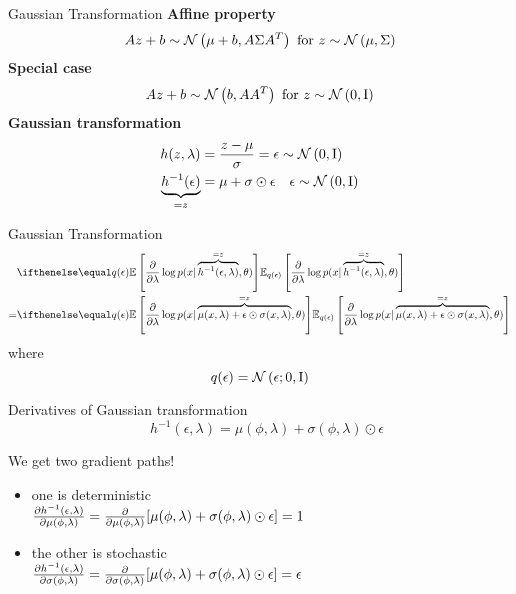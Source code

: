 \documentclass[14pt, aspectratio=169]{beamer}
\begin{document}
\begin{frame}{Gaussian Transformation}
\pause
\textbf{Affine property}
\begin{equation*}
Az + b \sim \mathcal{N}\left(\mu + b,A\Sigma A^{T}\right) \text{ for } z \sim \mathcal{N}\left(\mu,\Sigma\right)
\end{equation*}
\pause
\textbf{Special case}
\begin{equation*}
Az + b \sim \mathcal{N}\left(b,A A^{T}\right) \text{ for } z \sim \mathcal{N}\left(0,\operatorname{I}\right)
\end{equation*}
\pause
\textbf{Gaussian transformation}
\begin{align*}
h(z, \lambda) &= \frac{z - \mu}{ \sigma } = \epsilon \sim \mathcal{N}\left(0,\operatorname{I}\right) \\
\underbrace{h^{-1}(\epsilon)}_{=z} &= \mu + \sigma \odot \epsilon~~~\epsilon \sim \mathcal{N}\left(0,\operatorname{I}\right)
\end{align*}
\end{frame}

\begin{frame}{Gaussian Transformation}
\begin{equation*}
\begin{aligned}
&\E[q(\epsilon)]{\pdv{\lambda} \log p(x| \overbrace{h^{-1}(\epsilon, \lambda)}^{=z}, \theta)}  \\
= &\E[q(\epsilon)]{\pdv{\lambda} \log p(x| \overbrace{\mu(x, \lambda) + \epsilon \odot \sigma(x, \lambda)}^{=z}, \theta)}
\end{aligned}
\end{equation*}
\pause
where
\begin{equation*}
q(\epsilon) = \mathcal{N}\left(\epsilon; 0, \operatorname{I}\right)
\end{equation*}
\end{frame}

\begin{frame}{Derivatives of Gaussian transformation}
$$\quad h^{-1}(\epsilon, \lambda) = \mu(\phi,\lambda) + \sigma(\phi,\lambda) \odot \epsilon $$

We get two gradient paths! \pause \\

\begin{itemize}
	\item one is \alert{deterministic}\\
	$\pdv{h^{-1}(\epsilon, \lambda)}{\mu(\phi,\lambda)} = \pdv{\mu(\phi,\lambda)}[\mu(\phi,\lambda) + \sigma(\phi,\lambda) \odot \epsilon] = 1$ \pause
	\item the other is  \alert{stochastic}\\
	$\pdv{h^{-1}(\epsilon, \lambda)}{\sigma(\phi,\lambda)} = \pdv{\sigma(\phi,\lambda)}[ \mu(\phi,\lambda) + \sigma(\phi,\lambda) \odot \epsilon] = \epsilon$
\end{itemize}

\end{frame}
\end{document}
